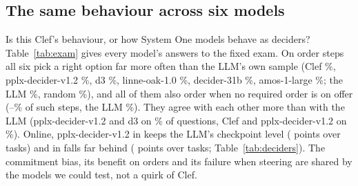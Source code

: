 \subsection{The same behaviour across six models}\label{sec:deciders}

Is this Clef's behaviour, or how System One models behave as deciders? Table~\ref{tab:exam} gives every model's
answers to the fixed exam. On order steps all six pick a right option far more often than the LLM's own sample (Clef
\EXaccClef\%, pplx-decider-v1.2 \EXaccPplx\%, d3 \EXaccDthree\%, linne-oak-1.0 \EXaccLinne\%, decider-31b
\EXaccMapika\%, amos-1-large \EXaccAmos\%; the LLM \EXaccFirst\%, random \EXaccRandom\%), and all of them also order
when no required order is on offer (\EXnoneAmos--\EXnonePplx\% of such steps, the LLM \EXnoneFirst\%). They agree with
each other more than with the LLM (pplx-decider-v1.2 and d3 on \EXpairPplxDthree\% of questions, Clef and
pplx-decider-v1.2 on \EXpairClefPplx\%). Online, pplx-decider-v1.2 in \sel{} keeps the LLM's checkpoint level
(\ONSelPplxcp{} points over \ONSelPplxn{} tasks) and in \tool{} falls far behind (\ONToolPplxcp{} points over
\ONToolPplxn{} tasks; Table~\ref{tab:deciders}). The commitment bias, its benefit on orders and its failure when
steering are shared by the models we could test, not a quirk of Clef.

\begin{table}[t]
\centering\small
\resizebox{\columnwidth}{!}{}
\caption{\textbf{The same exam for every decider} (PhysicianBench, the LLM's own logged states and proposals;
\EXcommon{} questions answered by every decider, \EXkeyed{} of them with an order key). Right: picks a required
order on order steps where options differ. Orders, required / none req.: picks an ordering option when one places a
required order, or when none does. Agrees w/ LLM: same pick as the LLM's own sample. Act, Note: share of all picks
that place orders or write the note.}
\label{tab:exam}
\end{table}

\begin{table}[t]
\centering\small
\resizebox{\columnwidth}{!}{}
\caption{\textbf{Whole tasks with another decider in Clef's seat.} Paired checkpoint differences with 95\% intervals,
each on the tasks both arms have completed.}
\label{tab:deciders}
\end{table}
